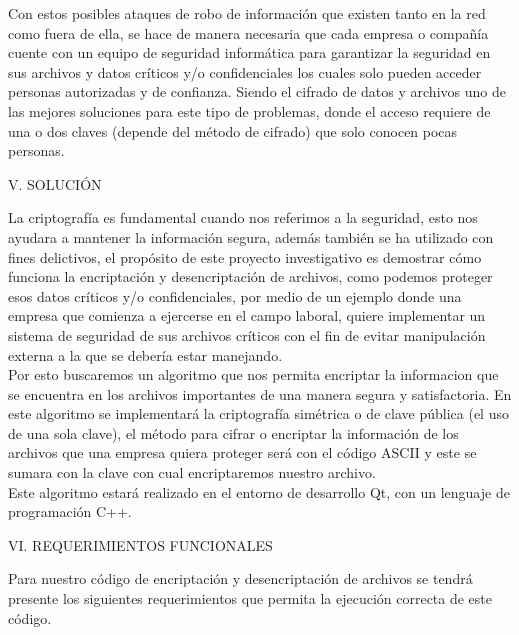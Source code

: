 \documentclass[9pt,24pt,twocolumn]{article}
\begin{document}
{Con estos posibles ataques de robo de información que existen tanto en la red como fuera de ella, se hace de manera necesaria que cada empresa o compañía cuente con un equipo de seguridad informática para garantizar la seguridad en sus archivos y datos críticos y/o confidenciales los cuales solo pueden acceder personas autorizadas y de confianza. Siendo el cifrado de datos y archivos uno de las mejores soluciones para este tipo de problemas, donde el acceso requiere de una o dos claves (depende del método de cifrado) que solo conocen pocas personas.}
\\

\begin{center}
{V.  SOLUCIÓN}
\end{center}

{La criptografía es fundamental cuando nos referimos a la seguridad, esto nos ayudara a mantener la información segura, además también se ha utilizado con fines delictivos, el propósito de este proyecto investigativo es demostrar cómo funciona la encriptación y desencriptación de archivos, como podemos proteger esos datos críticos y/o confidenciales, por medio de un ejemplo donde una empresa que comienza a ejercerse en el campo laboral, quiere implementar un sistema de seguridad de sus archivos críticos con el fin de evitar manipulación externa a la que se debería estar manejando.}
\\

{Por esto buscaremos un algoritmo que nos permita encriptar la informacion que se encuentra en los archivos importantes de una manera segura y satisfactoria.  En este algoritmo se implementará la criptografía simétrica o de clave pública (el uso de una sola clave), el método para cifrar o encriptar la información de los archivos que una empresa quiera proteger será con el código ASCII y este se sumara con la clave con cual encriptaremos nuestro archivo.}
\\

{Este algoritmo estará realizado en el entorno de desarrollo Qt, con un lenguaje de programación C++.}
\\


\begin{center}
{VI.  REQUERIMIENTOS FUNCIONALES}
\end{center}

{Para nuestro código de encriptación y desencriptación de archivos se tendrá presente los siguientes requerimientos que permita la ejecución correcta de este código.}
\\
\end{document}
